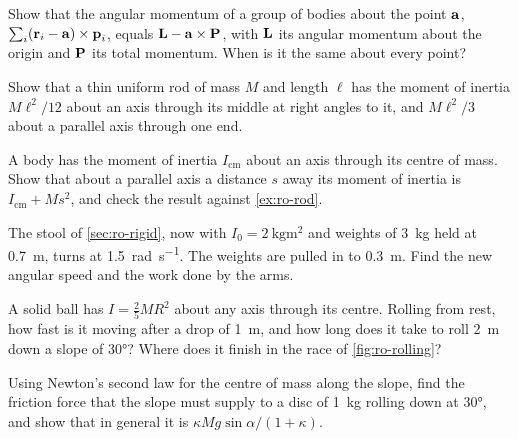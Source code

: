 \begin{exercise}
\label{ex:ro-origin}
Show that the angular momentum of a group of bodies about the point
$\bm{\mathrm{a}}$, $\sum_i(\bm{\mathrm{r}}_i - \bm{\mathrm{a}})\times\bm{\mathrm{p}}_i$, equals $\bm{\mathrm{L}} -
\bm{\mathrm{a}}\times\bm{\mathrm{P}}$, with $\bm{\mathrm{L}}$ its angular momentum about the origin
and $\bm{\mathrm{P}}$ its total momentum. When is it the same about every point?
\end{exercise}

\begin{exercise}[a rod]
\label{ex:ro-rod}
Show that a thin uniform rod of mass $M$ and length $\ell$ has the moment
of inertia $M\ell^2/12$ about an axis through its middle at right angles to
it, and $M\ell^2/3$ about a parallel axis through one end.
\end{exercise}

\begin{exercise}
\label{ex:ro-parallel}
A body has the moment of inertia $I_{\mathrm{cm}}$ about an axis through
its centre of mass. Show that about a parallel axis a distance $s$ away its
moment of inertia is $I_{\mathrm{cm}} + Ms^2$, and check the result
against \cref{ex:ro-rod}.
\end{exercise}

\begin{exercise}
\label{ex:ro-stool}
The stool of \cref{sec:ro-rigid}, now with $I_0 =
\SI{2}{\kilogram\metre\squared}$ and weights of \SI{3}{\kilogram} held at
\SI{0.7}{\metre}, turns at \SI{1.5}{\radian\per\second}. The weights are
pulled in to \SI{0.3}{\metre}. Find the new angular speed and the work done
by the arms.
\end{exercise}

\begin{exercise}
\label{ex:ro-sphere}
A solid ball has $I = \frac25 MR^2$ about any axis through its centre.
Rolling from rest, how fast is it moving after a drop of \SI{1}{\metre}, and
how long does it take to roll \SI{2}{\metre} down a slope of \ang{30}?
Where does it finish in the race of \cref{fig:ro-rolling}?
\end{exercise}

\begin{exercise}
\label{ex:ro-friction}
Using Newton's second law for the centre of mass along the slope, find the
friction force that the slope must supply to a disc of \SI{1}{\kilogram}
rolling down at \ang{30}, and show that in general it is $\kappa Mg\sin
\alpha/(1 + \kappa)$.
\end{exercise}


